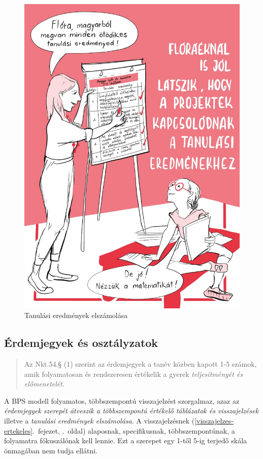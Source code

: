 \begin{figure}
\centering
\includegraphics{pics/6b_tantargyi_flora.jpg}
\caption{Tanulási eredmények elszámolása}
\end{figure}

\hypertarget{erdemjegyek-es-osztalyzatok}{%
\subsection{Érdemjegyek és
osztályzatok}\label{erdemjegyek-es-osztalyzatok}}

\begin{quote}
Az Nkt.54.§ (1) szerint az érdemjegyek a tanév közben kapott 1-5 számok,
amik folyamatosan és rendszeresen értékelik a gyerek
\emph{teljesítményét és előmenetelét}.
\end{quote}

A BPS modell folyamatos, többszempontú visszajelzést szorgalmaz, azaz az
\emph{érdemjegyek szerepét átveszik a többszempontú értékelő táblázatok
és visszajelzések} illetve a \emph{tanulási eredmények elszámolása}. A
visszajelzésnek (\ref{visszajelzes-ertekeles}.~fejezet, \pageref{visszajelzes-ertekeles}.~oldal)
alaposnak, specifikusnak, többszempontúnak, a folyamatra fókuszálónak
kell lennie. Ezt a szerepet egy 1-től 5-ig terjedő skála önmagában nem
tudja ellátni.

